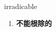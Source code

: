 
\begin{frame}
{\huge irradicable}
\begin{center}
\begin{enumerate}\Large
  \item \textbf{不能根除的}
\end{enumerate}
\end{center}
\end{frame}
